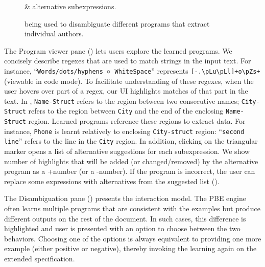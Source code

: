 \begin{figure}[t]
    \uwsinglespace
    \begin{tcbraster}[beamer, raster columns=1, size=minimal]
        \centering
    \end{tcbraster}
    \caption{\ProgramNavigationTab \& alternative subexpressions.}
    \label{fig:interactive:ui:alternatives}
\end{figure}

\begin{figure}[t]
    \uwsinglespace
    \begin{tcbraster}[beamer, raster columns=1, size=minimal]
        \centering
    \end{tcbraster}
    \caption{\ConversationalClarification being used to disambiguate different programs that extract individual
    authors.}
    \label{fig:interactive:ui:disambiguation}
\end{figure}

The Program viewer pane () lets users explore the learned programs.
We concisely describe regexes that are used to match strings in the input text.
For instance, ``\texttt{Words/dots/hyphens $\mathrel{\circ}$ WhiteSpace}''
represents \texttt{[-.\textbackslash p{Lu}\textbackslash  p{Ll}]+o\textbackslash p{Zs}+} (viewable in code mode).
To facilitate understanding of these regexes, when the user hovers over
part of a regex, our UI highlights matches of that part in the text.
In , \texttt{Name-Struct} refers to the region
between two consecutive names; \texttt{City-Struct} refers to the region
between \texttt{City} and the end of the enclosing \texttt{Name-Struct} region.
Learned programs reference these regions to extract data.
For instance, \texttt{Phone} is learnt relatively to enclosing
\texttt{City-struct} region: ``\texttt{second line}'' refers to the line in the \texttt{City} region.
In addition, clicking on the triangular marker opens a list of alternative suggestions for each subexpression.
We show number of highlights that will be added (or changed/removed) by the alternative
program as a +number (or a -number).
If the program is incorrect, the user can replace some expressions with alternatives from the suggested list
().

The Disambiguation pane () presents the \ConversationalClarification interaction
model.
The PBE engine often learns multiple programs that are consistent with the examples but produce different outputs
on the rest of the document.
In such cases, this difference is highlighted and user is presented with an option to choose between the two behaviors.
Choosing one of the options is always equivalent to providing one more example (either positive or negative), thereby
invoking the learning again on the extended specification.

